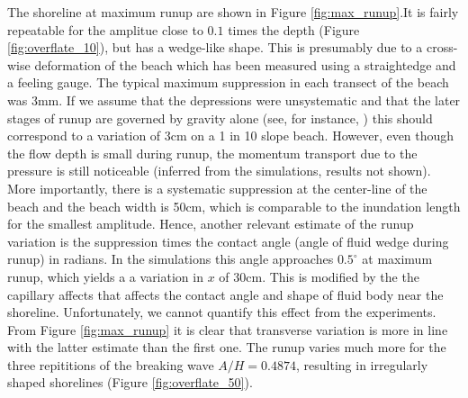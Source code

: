 \documentclass[review]{elsarticle}
\newcommand{\sidenote}[1]{\marginpar{\footnotesize #1}}
\begin{document}
The shoreline at maximum runup are shown in Figure \ref{fig:max_runup}.It is fairly repeatable for the amplitue close to $0.1$ times the 
depth (Figure \ref{fig:overflate_10}), but has a wedge-like shape. 
 This is presumably due to a cross-wise deformation  of the beach 
which has been measured using a straightedge and a feeling gauge. 
The typical maximum suppression in each transect of the beach was 3mm.
If we assume that the depressions were unsystematic and that the later
stages of runup are governed by gravity alone (see, for instance, \cite{jensen2003experimental}) this should correspond to a variation
 of 3cm on a 1 in 10 slope beach. However, even though the\sidenote{Should have had the average runup height}
flow depth is small during runup, the momentum transport due to
 the pressure is still noticeable (inferred from the simulations, results not shown). More importantly, there is a systematic suppression at the center-line of the beach and the beach width is 50cm, which is comparable to the inundation length for the smallest amplitude. 
Hence, another relevant estimate of the runup variation is the suppression times the contact angle (angle of fluid wedge during runup) in radians. In  the simulations this angle approaches $0.5^\circ$ at maximum runup, which yields a a variation in $x$ of 30cm. This is modified by 
the the capillary affects that affects the contact angle and 
shape of fluid body near the shoreline. Unfortunately, we cannot
quantify this effect from the experiments.  
From Figure 
\ref{fig:max_runup} it is clear that transverse variation is more in line with the latter estimate than the first one. The  runup   varies much more for the three repititions of the breaking wave $A/H=0.4874$,
resulting in irregularly shaped shorelines  (Figure \ref{fig:overflate_50}).
\end{document}
